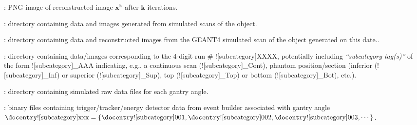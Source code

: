 \begin{tcbenvironment}
\begin{tcbenumbox}
\begin{ThinEnum}
\begin{ThinEnum}
\begin{ThinEnum}
\begin{ThinEnum}
\begin{ThinEnum}
\begin{ThinEnum}
\begin{ThinEnum}
\begin{ThinEnum}
\begin{ThinEnum}
\begin{ThinEnum}
\begin{ThinEnum}
                                                    \item {} : PNG image of reconstructed image $\boldsymbol{x^k}$ after $\boldsymbol{k}$ iterations.
                                                \end{ThinEnum}%
                                        \end{ThinEnum}%
                                    \end{ThinEnum}%
                                \end{ThinEnum}%
                            \end{ThinEnum}%
                        \end{ThinEnum}%
                    \end{ThinEnum}%
                \end{ThinEnum}%
            \end{ThinEnum}%
            \item {} : directory containing data and images generated from simulated scans of the object.
            \begin{ThinEnum}
                    \item {} : directory containing data and reconstructed images from the GEANT4 simulated scan of the object generated on this date..
            \begin{ThinEnum}
                \item {} : directory containing data/images corresponding to the 4-digit run \# \docentry![subcategory]{XXXX}, potentially including \emph{``subcategory tag(s)''} of the form \docentry![subcategory]{\_AAA} indicating, e.g., a continuous scan (\docentry![subcategory]{\_Cont}), phantom position/section (inferior (\docentry![subcategory]{\_Inf}) or superior (\docentry![subcategory]{\_Sup}), top (\docentry![subcategory]{\_Top}) or bottom (\docentry![subcategory]{\_Bot}), etc.).
                   \begin{ThinEnum}
                        \item {} : directory containing simulated raw data files for each gantry angle.
                        \begin{ThinEnum}
                            \item {} : binary files containing trigger/tracker/energy detector data from event builder associated with gantry angle $\text{\docentry![subcategory]{xxx}} =\{\text{\docentry![subcategory]{001}}, \text{\docentry![subcategory]{002}}, \text{\docentry![subcategory]{003}}, \cdots\}$.

\end{ThinEnum}
\end{ThinEnum}
\end{ThinEnum}
\end{ThinEnum}
\end{ThinEnum}
\end{ThinEnum}
\end{tcbenumbox}
\end{tcbenvironment}
